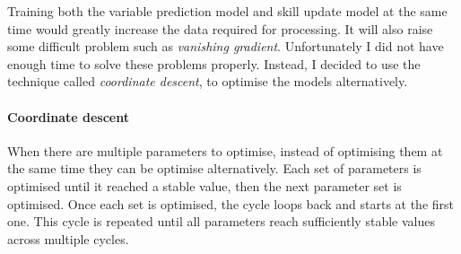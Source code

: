 \documentclass[12pt,a4paper]{book}
\begin{document}
Training both the variable prediction model and skill update model at the same time would greatly increase the data required for processing.
It will also raise some difficult problem such as \emph{vanishing gradient}.
Unfortunately I did not have enough time to solve these problems properly.
Instead, I decided to use the technique called \emph{coordinate descent}, to optimise the models alternatively.
\paragraph{Coordinate descent}
When there are multiple parameters to optimise, instead of optimising them at the same time they can be optimise alternatively.
Each set of parameters is optimised until it reached a stable value, then the next parameter set is optimised.
Once each set is optimised, the cycle loops back and starts at the first one.
This cycle is repeated until all parameters reach sufficiently stable values across multiple cycles.
\end{document}
